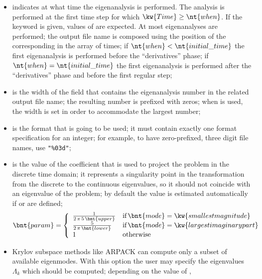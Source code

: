 \begin{itemize}
\item {} indicates at what time the eigenanalysis is performed.
	The analysis is performed at the first time step for which
	$\kw{Time} \ge \nt{when}$.
	If the keyword  is given,  values
	of  are expected.  At most  eigenanalyses
	are performed; the output file name is composed using
	the position of the corresponding  in the array
	of times;
	if $\nt{when} < \nt{initial\_time}$ the first eigenanalysis
	is performed before the ``derivatives'' phase;
	if $\nt{when} = \nt{initial\_time}$ the first eigenanalysis
	is performed after the ``derivatives'' phase
	and before the first regular step;
\item {} is the width of the field that contains the eigenanalysis number
	in the related output file name; the resulting number is prefixed with zeros;
	when  is used, the width is set in order to accommodate
	the largest number;
\item {} is the format that is going to be used; it must contain exactly one
	format specification for an integer; for example, to have zero-prefixed, three digit
	file names, use \texttt{"\%03d"};
\item {} is the value of the coefficient that is used to project
	the problem in the discrete time domain; it represents
	a singularity point in the transformation from the discrete
	to the continuous eigenvalues, so it should not coincide with
	an eigenvalue of the problem; by default the value is estimated
        automatically if  or  are defined;
        \begin{align}
          \bnt{param} = \left\{
          \begin{array}{ll}
            \frac{1}{2\,\pi\,5\,\bnt{upper}} & \text{if} \, \bnt{mode} = \kw{smallest magnitude} \nonumber \\
            \frac{5}{2\,\pi\,\bnt{lower}} & \text{if} \, \bnt{mode} = \kw{largest imaginary part} \nonumber \\
            1 & \text{otherwise} \nonumber
          \end{array}\right.
        \end{align}        
\item {} Krylov subspace methods like ARPACK can compute only a subset of
        available eigenmodes. With this option the user may specify the eigenvalues
        $\Lambda_k$ which should be computed; depending on the value of ,

\end{itemize}
